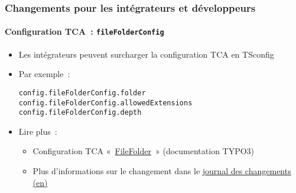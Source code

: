 %

\begin{frame}[fragile]
	\frametitle{Changements pour les intégrateurs et développeurs}
	\framesubtitle{Configuration TCA~: \texttt{fileFolderConfig}}


	\begin{itemize}
		\item Les intégrateurs peuvent surcharger la configuration TCA en TSconfig
		\item Par exemple~:
\begin{lstlisting}
config.fileFolderConfig.folder
config.fileFolderConfig.allowedExtensions
config.fileFolderConfig.depth
\end{lstlisting}

		\item Lire plus~:

			\begin{itemize}
				\item Configuration TCA
					«~\href{https://docs.typo3.org/m/typo3/reference-tca/master/en-us/ColumnsConfig/Type/Select/Properties/FileFolder.html#filefolder}{FileFolder}~»
					(documentation TYPO3)
				\item Plus d'informations sur le changement dans le \href{https://docs.typo3.org/c/typo3/cms-core/master/en-us/Changelog/11.4/Feature-94406-OverrideFileFolderTCAConfigurationWithTSconfig.html}{journal des changements (en)}
		\end{itemize}

	\end{itemize}

\end{frame}

